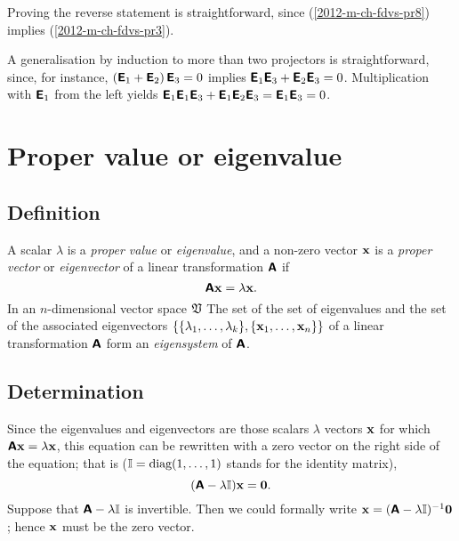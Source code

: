 {Proving the reverse statement is straightforward, since (\ref{2012-m-ch-fdvs-pr8}) implies  (\ref{2012-m-ch-fdvs-pr3}).

A generalisation by induction to more than two projectors is straightforward,
since, for instance,
$\left(\textsf{\textbf{E}}_1+\textsf{\textbf{E}}_2\right)\textsf{\textbf{E}}_3=0$
implies
$ \textsf{\textbf{E}}_1\textsf{\textbf{E}}_3+\textsf{\textbf{E}}_2\textsf{\textbf{E}}_3=0$.
Multiplication with $\textsf{\textbf{E}}_1$ from the left yields
$
\textsf{\textbf{E}}_1\textsf{\textbf{E}}_1\textsf{\textbf{E}}_3+\textsf{\textbf{E}}_1\textsf{\textbf{E}}_2\textsf{\textbf{E}}_3=
\textsf{\textbf{E}}_1 \textsf{\textbf{E}}_3=
0$.
 \eproof }


\section{Proper value or eigenvalue}

\subsection{Definition}

A scalar $\lambda$ is a {\em proper value} or {\em eigenvalue},
and a non-zero vector ${\bf x}$ is a {\em proper vector} or {\em eigenvector}
of a linear transformation $\textsf{\textbf{A}}$
if
\begin{equation}
\textsf{\textbf{A}}{\bf x}=   \lambda {\bf x}.
\end{equation}
In an $n$-dimensional
vector space $\frak V$
The set of the set of eigenvalues and the set of the associated eigenvectors
$\{\{\lambda_1,\ldots ,\lambda_k\},\{{\bf x}_1,\ldots ,{\bf x}_n\}\}$
of a linear transformation $\textsf{\textbf{A}}$ form an {\em eigensystem} of $\textsf{\textbf{A}}$.

\subsection{Determination}



Since the eigenvalues and eigenvectors are those scalars $\lambda$  vectors ${\bf x}$ for which $\textsf{\textbf{A}}{\bf x}=   \lambda {\bf x}$,
this equation can be rewritten with a zero vector on the right side of the equation; that is (${\Bbb I}=\textrm{diag}(1,\ldots ,1)$ stands for the identity matrix),
\begin{equation}
(\textsf{\textbf{A}} - \lambda {\Bbb I}){\bf x}= {\bf 0}.
\label{2011-m-eve}
\end{equation}
Suppose that $\textsf{\textbf{A}} - \lambda {\Bbb I}$ is invertible. Then we could formally write
${\bf x} = (\textsf{\textbf{A}} - \lambda {\Bbb I})^{-1}{\bf 0}$; hence ${\bf x}$ must be the zero vector.

